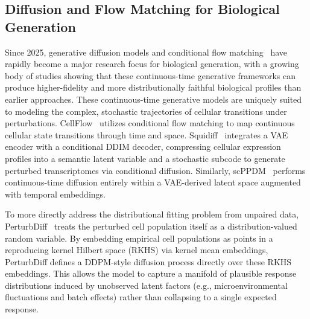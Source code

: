 \documentclass[11pt]{article}
\begin{document}
\subsection{Diffusion and Flow Matching for Biological Generation}
Since 2025, generative diffusion models and conditional flow matching~\cite{ho2020ddpm,lipman2023flow} have rapidly become a major research focus for biological generation, with a growing body of studies showing that these continuous-time generative frameworks can produce higher-fidelity and more distributionally faithful biological profiles than earlier approaches. These continuous-time generative models are uniquely suited to modeling the complex, stochastic trajectories of cellular transitions under perturbations. CellFlow~\cite{klein2025cellflow} utilizes conditional flow matching to map continuous cellular state transitions through time and space. Squidiff~\cite{he2025squidiff} integrates a VAE encoder with a conditional DDIM decoder, compressing cellular expression profiles into a semantic latent variable and a stochastic subcode to generate perturbed transcriptomes via conditional diffusion. Similarly, scPPDM~\cite{liang2025scppdm} performs continuous-time diffusion entirely within a VAE-derived latent space augmented with temporal embeddings.

To more directly address the distributional fitting problem from unpaired data, PerturbDiff~\cite{yuan2026perturbdiff} treats the perturbed cell population itself as a distribution-valued random variable. By embedding empirical cell populations as points in a reproducing kernel Hilbert space (RKHS) via kernel mean embeddings, PerturbDiff defines a DDPM-style diffusion process directly over these RKHS embeddings. This allows the model to capture a manifold of plausible response distributions induced by unobserved latent factors (e.g., microenvironmental fluctuations and batch effects) rather than collapsing to a single expected response.
\end{document}
